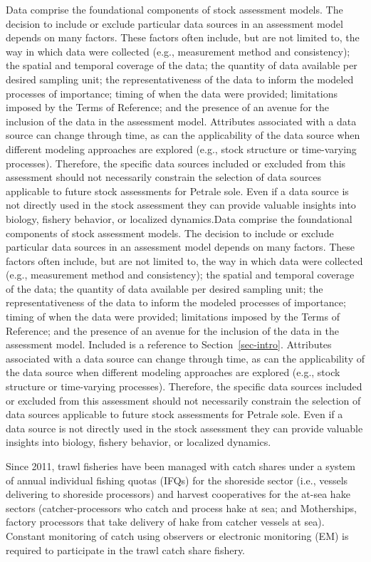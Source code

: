 \documentclass[
]{scrartcl}
\begin{document}
Data comprise the foundational components of stock assessment models.
The decision to include or exclude particular data sources in an
assessment model depends on many factors. These factors often include,
but are not limited to, the way in which data were collected (e.g.,
measurement method and consistency); the spatial and temporal coverage
of the data; the quantity of data available per desired sampling unit;
the representativeness of the data to inform the modeled processes of
importance; timing of when the data were provided; limitations imposed
by the Terms of Reference; and the presence of an avenue for the
inclusion of the data in the assessment model. Attributes associated
with a data source can change through time, as can the applicability of
the data source when different modeling approaches are explored (e.g.,
stock structure or time-varying processes). Therefore, the specific data
sources included or excluded from this assessment should not necessarily
constrain the selection of data sources applicable to future stock
assessments for Petrale sole. Even if a data source is not directly used
in the stock assessment they can provide valuable insights into biology,
fishery behavior, or localized dynamics.Data comprise the foundational
components of stock assessment models. The decision to include or
exclude particular data sources in an assessment model depends on many
factors. These factors often include, but are not limited to, the way in
which data were collected (e.g., measurement method and consistency);
the spatial and temporal coverage of the data; the quantity of data
available per desired sampling unit; the representativeness of the data
to inform the modeled processes of importance; timing of when the data
were provided; limitations imposed by the Terms of Reference; and the
presence of an avenue for the inclusion of the data in the assessment
model. Included is a reference to Section~\ref{sec-intro}. Attributes
associated with a data source can change through time, as can the
applicability of the data source when different modeling approaches are
explored (e.g., stock structure or time-varying processes). Therefore,
the specific data sources included or excluded from this assessment
should not necessarily constrain the selection of data sources
applicable to future stock assessments for Petrale sole. Even if a data
source is not directly used in the stock assessment they can provide
valuable insights into biology, fishery behavior, or localized dynamics.

Since 2011, trawl fisheries have been managed with catch shares under a
system of annual individual fishing quotas (IFQs) for the shoreside
sector (i.e., vessels delivering to shoreside processors) and harvest
cooperatives for the at-sea hake sectors (catcher-processors who catch
and process hake at sea; and Motherships, factory processors that take
delivery of hake from catcher vessels at sea). Constant monitoring of
catch using observers or electronic monitoring (EM) is required to
participate in the trawl catch share fishery.
\end{document}

